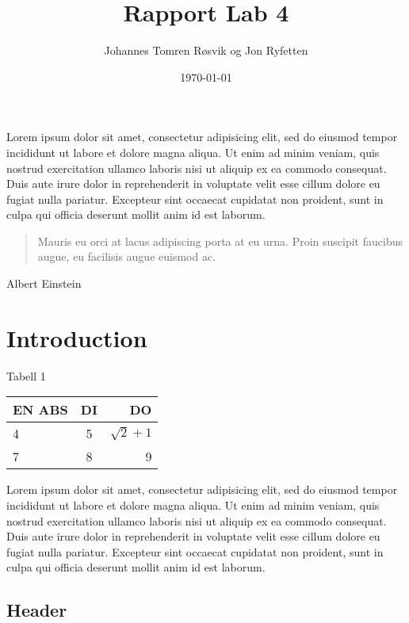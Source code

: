 \documentclass{article}
\title{Rapport Lab 4}
\author{Johannes Tomren Røsvik og Jon Ryfetten}
\date{\today}
\begin{document}
\maketitle
Lorem ipsum dolor sit amet, consectetur adipisicing elit, sed do eiusmod tempor incididunt ut labore et dolore magna aliqua. Ut enim ad minim veniam, quis nostrud exercitation ullamco laboris nisi ut aliquip ex ea commodo consequat. Duis aute irure dolor in reprehenderit in voluptate velit esse cillum dolore eu fugiat nulla pariatur. Excepteur sint occaecat cupidatat non proident, sunt in culpa qui officia deserunt mollit anim id est laborum.

\begin{quote}
	Mauris eu orci at lacus adipiscing porta at eu urna. Proin suscipit faucibus augue, eu facilisis augue euismod ac.
\end{quote}
\begin{center}
	Albert Einstein
\end{center}

\section{Introduction}

\begin{center}
	Tabell 1
\end{center}
\begin{center} %
	\begin{tabular} {| l | c | r |} \hline
			EN ABS 	& DI 	& DO \\ \hline
			4 			& 5 	& $\sqrt{2} + 1$ \\ \hline
			7 			& 8 	& 9 \\ \hline
	\end{tabular}
\end{center}

Lorem ipsum dolor sit amet, consectetur adipisicing elit, sed do eiusmod tempor incididunt ut labore et dolore magna aliqua. Ut enim ad minim veniam, quis nostrud exercitation ullamco laboris nisi ut aliquip ex ea commodo consequat. Duis aute irure dolor in reprehenderit in voluptate velit esse cillum dolore eu fugiat nulla pariatur. Excepteur sint occaecat cupidatat non proident, sunt in culpa qui officia deserunt mollit anim id est laborum.

\subsection{Header}
\end{document}
